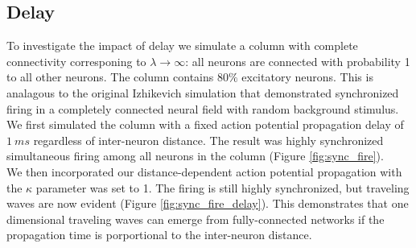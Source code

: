 \documentclass[a4paper,11pt]{article}
\begin{document}
\subsection{Delay}
To investigate the impact of delay we simulate a column with complete connectivity corresponing to $\lambda \rightarrow \infty$: all neurons are connected with probability 1 to all other neurons.
The column contains $80\%$ excitatory neurons.
This is analagous to the original Izhikevich simulation \cite{izzy_code} that demonstrated synchronized firing in a completely connected neural field with random background stimulus.
We first simulated the column with a fixed action potential propagation delay of $1~ms$ regardless of inter-neuron distance.
The result was highly synchronized simultaneous firing among all neurons in the column (Figure \ref{fig:sync_fire}). \\ 
We then incorporated our distance-dependent action potential propagation with the $\kappa$ parameter was set to 1.
The firing is still highly synchronized, but traveling waves are now evident (Figure \ref{fig:sync_fire_delay}).
This demonstrates that one dimensional traveling waves can emerge from fully-connected networks if the propagation time is porportional to the inter-neuron distance.
\end{document}
